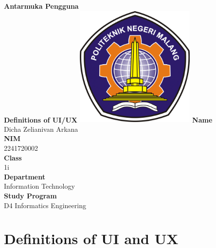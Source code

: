\documentclass[12pt,titlepage]{article}
\newcommand{\vSubject}{Antarmuka Pengguna}
\newcommand{\vSubtitle}{Definitions of UI/UX}
\newcommand{\vName}{Dicha Zelianivan Arkana}
\newcommand{\vNIM}{2241720002}
\newcommand{\vClass}{1i}
\newcommand{\vDepartment}{Information Technology}
\newcommand{\vStudyProgram}{D4 Informatics Engineering}
\begin{document}
\begin{titlepage}
    \centering
    \vfill
    {\bfseries\LARGE
        \vSubject\\
        \vskip0.25cm
        \vSubtitle
    }
    \vfill
    \includegraphics[width=6cm]{images/polinema-logo.png}
    \vfill
    {
        \textbf{Name}\\
        \vName\\
        \vskip0.5cm
        \textbf{NIM}\\
        \vNIM\\
        \vskip0.5cm
        \textbf{Class}\\
        \vClass\\
        \vskip0.5cm
        \textbf{Department}\\
        \vDepartment\\
        \vskip0.5cm
        \textbf{Study Program}\\
        \vStudyProgram
    }
\end{titlepage}

\tableofcontents
\pagebreak

\section{Definitions of UI and UX}
\end{document}
